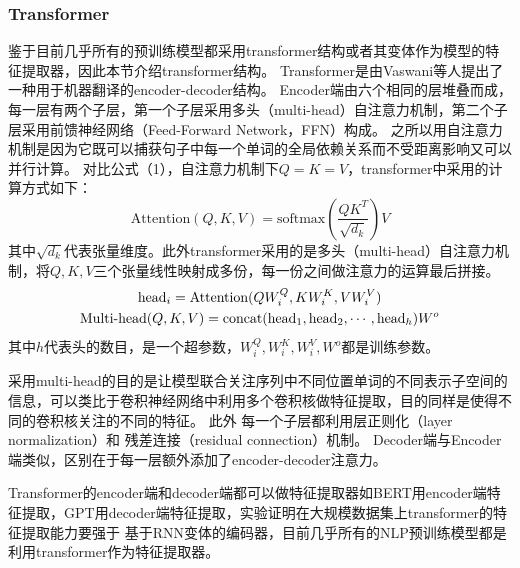 \subsubsection{Transformer}\label{transformer}
鉴于目前几乎所有的预训练模型都采用transformer结构或者其变体作为模型的特征提取器，因此本节介绍transformer结构。
Transformer是由Vaswani等人提出了一种用于机器翻译的encoder-decoder结构。
Encoder端由六个相同的层堆叠而成，每一层有两个子层，第一个子层采用多头（multi-head）自注意力机制，第二个子层采用前馈神经网络（Feed-Forward Network，FFN）构成。
之所以用自注意力机制是因为它既可以捕获句子中每一个单词的全局依赖关系而不受距离影响又可以并行计算。
对比公式（1），自注意力机制下$Q=K=V$，transformer中采用的计算方式如下：
\begin{equation}
\text{Attention}(Q,K,V)=\text{softmax}(\frac{QK^T}{\sqrt{d_k}})V
\end{equation}
其中$\sqrt{d_k}$代表张量维度。此外transformer采用的是多头（multi-head）自注意力机制，将$Q,K,V$三个张量线性映射成多份，每一份之间做注意力的运算最后拼接。
\begin{gather}
	\text{head}_i=\text{Attention}(QW_i^Q,KW_i^K,VW_i^V) \notag \\
	\text{Multi-head}(Q,K,V)=\text{concat}(\text{head}_1,\text{head}_2,\cdots,\text{head}_h)W^o
\end{gather}
其中$h$代表头的数目，是一个超参数，$W_i^Q,W_i^K,W_i^V,W^o$都是训练参数。

采用multi-head的目的是让模型联合关注序列中不同位置单词的不同表示子空间的信息，可以类比于卷积神经网络中利用多个卷积核做特征提取，目的同样是使得不同的卷积核关注的不同的特征。
此外
每一个子层都利用层正则化（layer normalization）和
残差连接（residual connection）机制。
Decoder端与Encoder端类似，区别在于每一层额外添加了encoder-decoder注意力。

Transformer的encoder端和decoder端都可以做特征提取器如BERT用encoder端特征提取，GPT用decoder端特征提取，实验证明在大规模数据集上transformer的特征提取能力要强于
基于RNN变体的编码器，目前几乎所有的NLP预训练模型都是利用transformer作为特征提取器。


